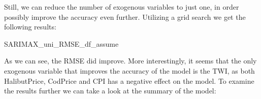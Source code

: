 Still, we can reduce the number of exogenous variables to just one, in order possibly improve the accuracy even further. Utilizing a grid search we get the following results:
\begin{table}[H]
    \begin{center}
        {SARIMAX_uni_RMSE_df_assume}
        \caption{Result from SARIMAX model with one exogenous variable.}\label{tab:SARIMAX_uni}
    \end{center}
\end{table}
As we can see, the RMSE did improve. More interestingly, it seems that the only exogenous variable that improves the accuracy of the model is the TWI, as both HalibutPrice, CodPrice and CPI has a negative effect on the model. To examine the results further we can take a look at the summary of the model:
